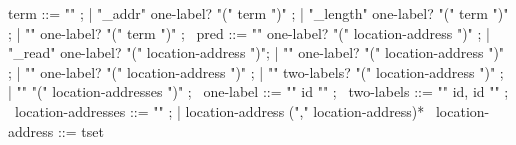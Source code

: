 \begin{syntax}
  term ::= "\null" ;
        | "\base_addr" { one-label? } "(" term ")" ;
        | "\block_length" { one-label? } "(" term ")" ;
        | "\offset" { one-label? } "(" term ")" ;
       \
  pred ::= "\valid" { one-label? } "(" location-address ")" ;
       |  { "\valid_read" } one-label? "(" location-address ")";
       |  { "\free" } one-label? "(" location-address ")" ;
       |  { "\allocated" } one-label? "(" location-address ")" ;
       |  { "\fresh" } two-labels? "(" location-address ")" ;
       |  "\separated" "(" location-addresses ")" ;
       \
  one-label ::= "{" id "}" ;
       \
  two-labels ::= "{" id, id "}" ;
       \
  location-addresses ::= "\nothing" ;
                    | location-address ("," location-address)*
  \
  location-address ::= tset
\end{syntax}


